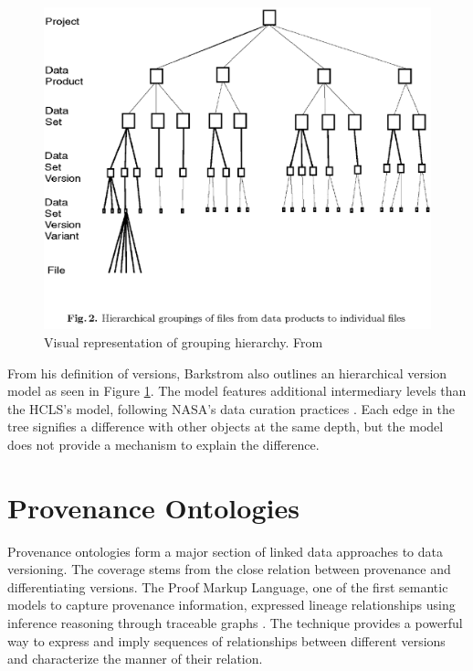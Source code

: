 \begin{figure}
	\centering
	\includegraphics[scale=0.50]{figures/hierarchy.png}
	\caption[Visual representation of grouping hierarchy.]{Visual representation of grouping hierarchy.  From \cite{Barkstrom2003}}
	\label{hierarchy}
\end{figure}

From his definition of versions, Barkstrom also outlines an hierarchical version model as seen in Figure \ref{hierarchy}.
The model features additional intermediary levels than the HCLS's model, following NASA's data curation practices \cite{barkstrom2014earth}.
Each edge in the tree signifies a difference with other objects at the same depth, but the model does not provide a mechanism to explain the difference.

\section{Provenance Ontologies}

Provenance ontologies form a major section of linked data approaches to data versioning.
The coverage stems from the close relation between provenance and differentiating versions.
The Proof Markup Language, one of the first semantic models to capture provenance information, expressed lineage relationships using inference reasoning through traceable graphs \cite{daSilva2006381}.
The technique provides a powerful way to express and imply sequences of relationships between different versions and characterize the manner of their relation.

